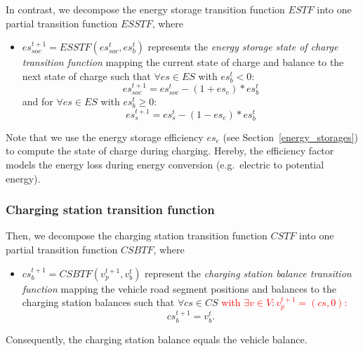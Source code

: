In contrast, we decompose the energy storage transition function $ESTF$ into one partial transition function $ESSTF$, where
\begin{itemize}
%	
	\item $es_{soc}^{t+1} = ESSTF(es_{soc}^t, es_b^t)$ represents the \textit{energy storage state of charge transition function} mapping the current state of charge and balance to the next state of charge such that $\forall es \in ES$ with $es_b^t < 0:$
	\[
	 es_{soc}^{t+1} = es_{soc}^t - (1+es_e) * es_b^t
	\]
	and for $\forall es \in ES$ with $es_b^t \geq 0:$
	\[
	es_s^{t+1} = es_s^t - (1-es_e) * es_b^t
	\]
	
\end{itemize}
Note that we use the energy storage efficiency $es_e$ (see Section~\ref{energy_storages}) to compute the state of charge during charging. Hereby, the efficiency factor models the energy loss during energy conversion (e.g.\ electric to potential energy). 

\subsubsection{Charging station transition function}
\label{transitions_stations}

Then, we decompose the charging station transition function $CSTF$ into one partial transition function $CSBTF$, where
\begin{itemize}
	\item $cs_b^{t+1} = CSBTF(v_p^{t+1}, v_b^t)$ represent the \textit{charging station balance transition function} mapping the vehicle road segment positions and balances to the charging station balances such that $\forall cs \in CS$ 
	\textcolor{red}{with $\exists v \in V: v_p^{t+1} = (cs, 0):$ }
	\[
		cs_b^{t+1} = v_b^{t} \textrm{.}
	\]
\end{itemize}
Consequently, the charging station balance equals the vehicle balance.

